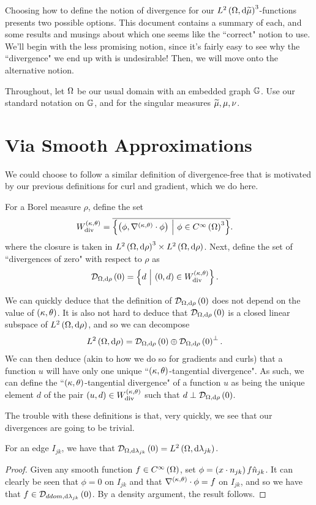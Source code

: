 \documentclass[11pt]{report}
\newcommand{\diver}{\mathrm{div}}
\newcommand{\ktdiv}[1]{\ktgrad_{#1}\cdot}
\newcommand{\divZero}[2]{\mathcal{D}_{#1, \md #2}\bracs{0}}
\begin{document}
Choosing how to define the notion of divergence for our $L^{2}\left( \Omega,\mathrm{d}\widetilde{\mu} \right)^3$-functions presents two possible options.
This document contains a summary of each, and some results and musings about which one seems like the ``correct" notion to use.
We'll begin with the less promising notion, since it's fairly easy to see why the ``divergence" we end up with is undesirable!
Then, we will move onto the alternative notion.

Throughout, let $\Omega$ be our usual domain with an embedded graph $\mathbb{G}$.
Use our standard notation on $\mathbb{G}$, and for the singular measures $\widetilde{\mu}, \mu, \nu$.

\section{Via Smooth Approximations}
We could choose to follow a similar definition of divergence-free that is motivated by our previous definitions for curl and gradient, which we do here.
\begin{definition}[$W^{\kt}_{\diver}$]
	For a Borel measure $\rho$, define the set
	\begin{align*}
		W^{\kt}_{\diver} &= \overline{\clbracs{ \bracs{\phi, \ktdiv{}\phi} \setVert \phi\in\smooth{\ddom}^3 }}.
	\end{align*}
	where the closure is taken in $L^{2}\left( \Omega,\mathrm{d}\rho \right)^3\times L^{2}\left( \Omega,\mathrm{d}\rho \right)$.
	Next, define the set of ``divergences of zero" with respect to $\rho$ as
	\begin{align*}
		\divZero{\ddom}{\rho} &= \clbracs{ d \setVert \bracs{0,d}\in W^{\kt}_{\diver}}.
	\end{align*}
\end{definition}
We can quickly deduce that the definition of $\divZero{\ddom}{\rho}$ does not depend on the value of $\left( \kappa, \theta \right)$.
It is also not hard to deduce that $\divZero{\ddom}{\rho}$ is a closed linear subspace of $L^{2}\left( \Omega,\mathrm{d}\rho \right)$, and so we can decompose
\begin{align*}
	\ltwo{\ddom}{\rho} &= \divZero{\ddom}{\rho} \oplus \divZero{\ddom}{\rho}^\perp.
\end{align*}
We can then deduce (akin to how we do so for gradients and curls) that a function $u$ will have only one unique ``$\left( \kappa, \theta \right)$-tangential divergence".
As such, we can define the ``$\left( \kappa, \theta \right)$-tangential divergence" of a function $u$ as being the unique element $d$ of the pair $\bracs{u,d}\in W^{\kt}_{\diver}$ such that $d\perp\divZero{\ddom}{\rho}$.

The trouble with these definitions is that, very quickly, we see that our divergences are going to be trivial.
\begin{lemma}
	For an edge $I_{jk}$, we have that $\divZero{\ddom}{\lambda_{jk}} = \ltwo{\ddom}{\lambda_{jk}}$.
\end{lemma}
\begin{proof}
	Given any smooth function $f\in C^{\infty}\left( \Omega \right)$, set $\phi = \left( x\cdot n_{jk} \right)f\hat{n}_{jk}$.
	It can clearly be seen that $\phi=0$ on $I_{jk}$ and that $\ktdiv{}\phi = f$ on $I_{jk}$, and so we have that $f\in\divZero{ddom}{\lambda_{jk}}$.
	By a density argument, the result follows.
\end{proof}
\end{document}
